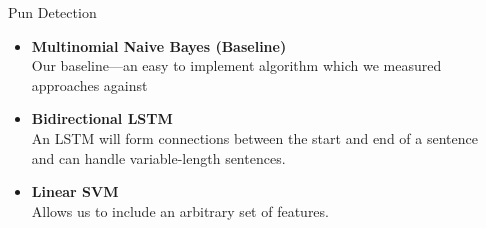 \documentclass[final]{beamer}
\newlength{\onecolwid}
\newlength{\twocolwid}
\begin{document}
\begin{frame}[t]
\begin{columns}[t]
\begin{column}{\twocolwid}
\begin{columns}[t,totalwidth=\twocolwid]
\begin{column}{\onecolwid}
\begin{block}{Pun Detection}
{							\begin{itemize}
								\item {\textbf{Multinomial Naive Bayes (Baseline)}\\
									Our baseline---an easy to implement algorithm which we measured approaches against
								}
								\item {\textbf{Bidirectional LSTM}\\
									An LSTM will form connections between the start and end of a sentence and can handle variable-length sentences.
								}
								\item {\textbf{Linear SVM}\\ 
									Allows us to include an arbitrary set of features.
								}
							\end{itemize}
						}
					\end{block}
				\end{column}
				\begin{column}{\onecolwid}\vspace{-.6in}
				

\end{column}
\end{columns}
\end{column}
\end{columns}
\end{frame}
\end{document}
